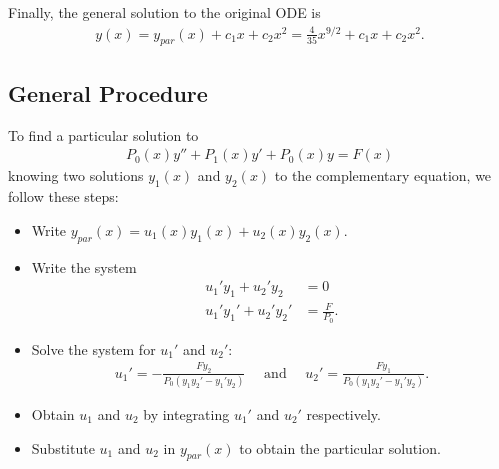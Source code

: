 \documentclass[12pt,a4paper]{article}
\begin{document}
\begin{notes}
Finally, the general solution to the original ODE is
	\begin{align*}
	y (x) = y_{par} (x) + c_1 x + c_2 x^2 = \frac{4}{35} x^{9/2} + c_1 x + c_2 x^2 .
	\end{align*}
	
\end{notes}

\phantom{1}

\newpage

\subsection{General Procedure}
To find a particular solution to
	\begin{align*}
	P_0 (x) y'' + P_1 (x) y' + P_0 (x) y = F(x)
	\end{align*}
knowing two solutions $y_1 (x)$ and $y_2 (x)$ to the complementary equation, we follow these steps:
	\begin{itemize}
	\item Write $y_{par} (x) = u_1(x) y_1 (x) + u_2 (x) y_2 (x)$.
	\item Write the system
		\begin{align*}
		u_1' y_1 + u_2' y_2 &= 0 \\
		u_1' y_1' + u_2' y_2' &= \frac{F}{P_0} .
		\end{align*}
	\item Solve the system for $u_1'$ and $u_2'$:
		\begin{align*}
		u_1' = -\frac{Fy_2}{P_0 (y_1 y_2' - y_1' y_2)} \quad \text{ and } \quad u_2' = \frac{Fy_1 }{P_0 (y_1 y_2' - y_1' y_2)} .
		\end{align*}
	\item Obtain $u_1$ and $u_2$ by integrating $u_1'$ and $u_2'$ respectively.
	\item Substitute $u_1$ and $u_2$ in $y_{par}(x)$ to obtain the particular solution.
	\end{itemize}
	
\vspace*{16pt}
	
\end{document}
